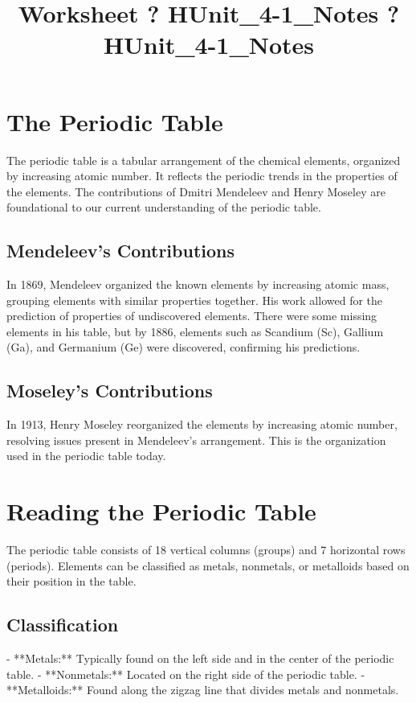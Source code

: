 \documentclass{article}
\title{Worksheet ? HUnit\_4-1\_Notes ? HUnit\_4-1\_Notes}
\author{}
\date{}
\begin{document}
\maketitle

\section*{The Periodic Table}
The periodic table is a tabular arrangement of the chemical elements, organized by increasing atomic number. It reflects the periodic trends in the properties of the elements. The contributions of Dmitri Mendeleev and Henry Moseley are foundational to our current understanding of the periodic table.

\subsection*{Mendeleev's Contributions}
In 1869, Mendeleev organized the known elements by increasing atomic mass, grouping elements with similar properties together. His work allowed for the prediction of properties of undiscovered elements. There were some missing elements in his table, but by 1886, elements such as Scandium (Sc), Gallium (Ga), and Germanium (Ge) were discovered, confirming his predictions.

\subsection*{Moseley's Contributions}
In 1913, Henry Moseley reorganized the elements by increasing atomic number, resolving issues present in Mendeleev's arrangement. This is the organization used in the periodic table today.

\section*{Reading the Periodic Table}
The periodic table consists of 18 vertical columns (groups) and 7 horizontal rows (periods). Elements can be classified as metals, nonmetals, or metalloids based on their position in the table.

\subsection*{Classification}
- **Metals:** Typically found on the left side and in the center of the periodic table.
- **Nonmetals:** Located on the right side of the periodic table.
- **Metalloids:** Found along the zigzag line that divides metals and nonmetals.
\end{document}
